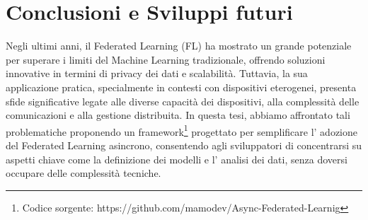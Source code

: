 \documentclass[a4paper, oneside, openright]{report}
\begin{document}
\clearpage{}
\clearpage{}\chapter{Conclusioni e Sviluppi futuri}\label{chap:conclusioni}
Negli ultimi anni, il Federated Learning (FL) ha mostrato un grande potenziale per superare i limiti del Machine Learning tradizionale, offrendo soluzioni innovative in termini di privacy dei dati e scalabilità. Tuttavia, la sua applicazione pratica, specialmente in contesti con dispositivi eterogenei, presenta sfide significative legate alle diverse capacità dei dispositivi, alla complessità delle comunicazioni e alla gestione distribuita. In questa tesi, abbiamo affrontato tali problematiche proponendo un framework\footnote{\label{nt:framework}Codice sorgente: https://github.com/mamodev/Async-Federated-Learnig} progettato per semplificare l’ adozione del Federated Learning asincrono, consentendo agli sviluppatori di concentrarsi su aspetti chiave come la definizione dei modelli e l’ analisi dei dati, senza doversi occupare delle complessità tecniche.
\end{document}
